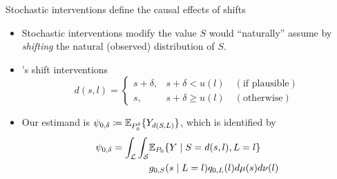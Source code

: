 \documentclass{beamer}
\begin{document}

\begin{frame}[c]{Stochastic interventions define the causal effects of shifts}

\begin{center}
\begin{itemize}
  \itemsep8pt
  \item Stochastic interventions modify the value $S$ would ``naturally''
    assume by \textit{shifting} the natural (observed) distribution of $S$.
  \item \cite{diaz2012population, diaz2018stochastic}'s shift
    interventions\footnotemark
     \begin{equation*}\label{shift_intervention}
       d(s, l) =
         \begin{cases}
           s + \delta, & s + \delta < u(l) \quad (\text{if plausible}) \\
           s, & s + \delta \geq u(l) \quad (\text{otherwise})
         \end{cases}
     \end{equation*}
  \item Our estimand is $\psi_{0,\delta} \coloneqq
    \mathbb{E}_{P_0^{\delta}}\{Y_{d(S,L)}\}$, which is identified by
    \begin{align*}
      \psi_{0,\delta} = \int_{\mathcal{L}} \int_{\mathcal{S}} &\mathbb{E}_{P_0}
        \{Y \mid S = d(s, l), L = l\} \\ &g_{0, S}(s \mid L = l)
        q_{0, L}(l) d\mu(s)d\nu(l)
    \end{align*}
\end{itemize}
\end{center}



\end{frame}
\end{document}
